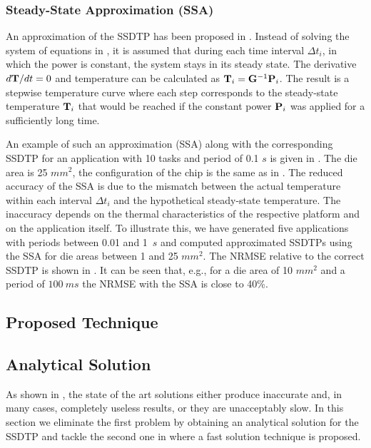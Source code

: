 \subsubsection{Steady-State Approximation (SSA)} 

An approximation of the SSDTP has been proposed in \cite{huang2009}. Instead of
solving the system of equations in , it is assumed that
during each time interval $\Delta t_i$, in which the power is constant, the
system stays in its steady state. The derivative $d\mathbf{T}/dt = 0$ and temperature
can be calculated as $\mathbf{T}_i = \mathbf{G}^{-1} \mathbf{P}_i$. The result is a stepwise
temperature curve where each step corresponds to the steady-state temperature
$\mathbf{T}_i$ that would be reached if the constant power $\mathbf{P}_i$ was applied for
a sufficiently long time.

An example of such an approximation (SSA) along with the corresponding SSDTP for
an application with 10 tasks and period of 0.1 $s$ is given in
. The die area is 25 $mm^2$, the configuration
of the chip is the same as in . The reduced accuracy of the SSA
is due to the mismatch between the actual temperature within each interval
$\Delta t_i$ and the hypothetical steady-state temperature. The inaccuracy
depends on the thermal characteristics of the respective platform and on the
application itself. To illustrate this, we have generated five applications with
periods between 0.01 and 1~$s$ and computed approximated SSDTPs using the SSA
for die areas between 1 and 25 $mm^2$. The NRMSE relative to the correct SSDTP
is shown in . It can be seen that, e.g., for a die area
of 10 $mm^2$ and a period of $100~ms$ the NRMSE with the SSA is close to 40\%.

\subsection{Proposed Technique} 

\subsection{Analytical Solution} 

As shown in , the state of the art solutions either
produce inaccurate and, in many cases, completely useless results, or they are
unacceptably slow. In this section we eliminate the first problem by obtaining
an analytical solution for the SSDTP and tackle the second one in
 where a fast solution technique is proposed.

